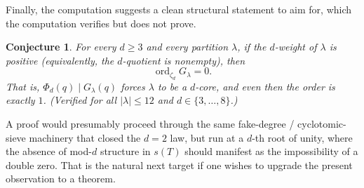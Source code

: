 \documentclass[11pt]{article}
\newtheorem{conjecture}{Conjecture}
\theoremstyle{definition}
\theoremstyle{remark}
\newcommand{\ord}{\operatorname{ord}}
\begin{document}
Finally, the computation suggests a clean structural statement to aim for, which the
computation verifies but does not prove.

\begin{conjecture}
\label{conj:positive-weight}
For every $d \ge 3$ and every partition $\lambda$, if the $d$-weight of $\lambda$ is
positive (equivalently, the $d$-quotient is nonempty), then
\[
\ord_{\zeta_d} G_\lambda = 0.
\]
That is, $\Phi_d(q) \mid G_\lambda(q)$ forces $\lambda$ to be a $d$-core, and even
then the order is exactly $1$. (Verified for all $|\lambda| \le 12$ and
$d \in \{3,\dots,8\}$.)
\end{conjecture}

A proof would presumably proceed through the same fake-degree / cyclotomic-sieve
machinery that closed the $d=2$ law, but run at a $d$-th root of unity, where the
absence of mod-$d$ structure in $s(T)$ should manifest as the impossibility of a double
zero. That is the natural next target if one wishes to upgrade the present
observation to a theorem.
\end{document}
